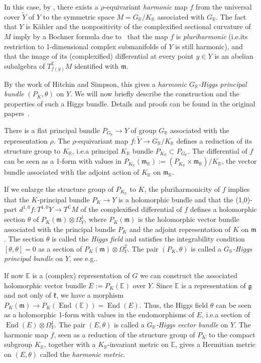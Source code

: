 \documentclass[10pt]{amsart}
\let\cites\cite
\newcommand{\citestar}[3]{\cite[#3]{#1}}
\theoremstyle{plain}
\theoremstyle{definition}
\DeclareMathOperator{\End}{End}
\newcommand{\bC}{\mathbb{C}}
\newcommand{\bE}{\mathbb{E}}
\newcommand{\bR}{\mathbb{R}}
\newcommand{\fgg}{\mathfrak{g}}
\newcommand{\fk}{\mathfrak{k}}
\newcommand{\fm}{\mathfrak{m}}
\providecommand{\eg}{e.g.}\providecommand{\ie}{i.e.}\providecommand{\etc}{etc.}\providecommand{\resp}{resp.}\providecommand{\cf}{cf.}
\begin{document}
In this case, by \cite{CorletteFlatGBundles},
there exists a $\rho$-equivariant \emph{harmonic} map $f$ from the universal cover $\tilde Y$ of $Y$ to the
symmetric space $M=G_\bR/K_\bR$ associated with $G_\bR$.
The fact that $Y$ is Kähler and the nonpositivity of the complexified sectional curvature of~$M$
imply by a Bochner formula due to~\cites{Sampson,Siu} that the map $f$ is \emph{pluriharmonic} (\ie its
restriction to 1-dimensional complex submanifolds of $Y$ is still harmonic), and that the image of its
(complexified) differential at every point $y\in Y$ is an abelian subalgebra of $T^\bC_{f(y)} M$
identified with $\fm$.

By the work of Hitchin and Simpson, this
gives a \emph{harmonic $G_\bR$-Higgs principal bundle} $(P_K,\theta)$ on $Y$. We will now briefly describe the
construction and the properties of such a Higgs bundle. Details and proofs can be found in the
original papers~\cites{HitchinSelfDual, HitchinLieTeich, S1, S2}.

There is a flat principal
bundle $P_{G_\bR}\to Y$ of group $G_\bR$ associated with the representation $\rho$. The $\rho$-equivariant map
$f:\tilde Y\to G_\bR/K_\bR$ defines a reduction of its structure group to $K_\bR$, \ie a principal
$K_\bR$ bundle $P_{K_\bR}\subset P_{G_\bR}$. The differential of $f$ can be seen as a 1-form with
values in $P_{K_\bR}(\fm_\bR):=(P_{K_\bR}\times\fm_\bR)/K_\bR$, the vector bundle associated with the adjoint action of $K_\bR$ on
$\fm_\bR$.

If we enlarge the structure group of $P_{K_\bR}$ to $K$,
the pluriharmonicity of $f$ implies that the $K$-principal bundle $P_K\to Y$ is a holomorphic
bundle and that the (1,0)-part $d^{1,0}f:T^{1,0}Y\to T^\bC M$ of the complexified differential
of $f$ defines a holomorphic section $\theta$ of
$P_K(\fm)\otimes\Omega^1_Y$, where $P_K(\fm)$ is the holomorphic vector bundle associated with the
principal bundle $P_K$ and the adjoint representation of $K$ on $\fm$. The section $\theta$ is called
the \emph{Higgs field} and satisfies the integrability
condition $[\theta,\theta]=0$ as a section of $P_K(\fm)\otimes\Omega^2_Y$.
The pair $(P_K,\theta)$ is called a \emph{$G_\bR$-Higgs principal bundle} on $Y$, see
\eg \citestar{BGPG2}*{}.

If now $\bE$ is a (complex) representation of $G$ we can construct the associated holomorphic vector bundle
$E:=P_K(\bE)$ over $Y$. Since $\bE$ is a representation of $\fgg$ and not only of $\fk$,
we have a morphism $P_K(\fm) \to P_K(\End(\bE)) = \End(E)$. Thus,
the Higgs field
$\theta$ can be seen as a holomorphic 1-form with values in the endomorphisms of $E$, \ie a
section of $\End(E)\otimes\Omega^1_Y$. The pair $(E,\theta)$
is called a \emph{$G_\bR$-Higgs vector bundle} on $Y$. The harmonic map $f$, seen as a reduction of the
structure group of $P_K$ to the compact subgroup $K_\bR$, together with a $K_\bR$-invariant metric on
$\bE$, gives a Hermitian metric on $(E,\theta)$
called the \emph{harmonic metric}.
\end{document}
